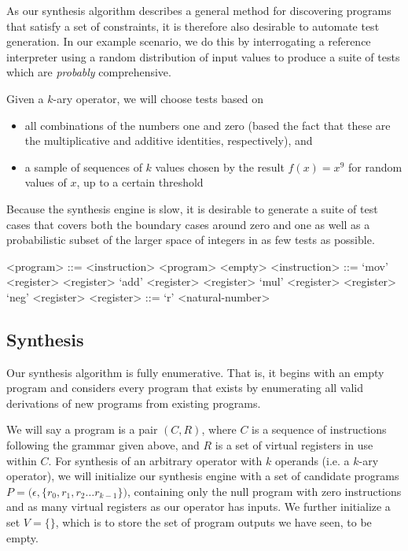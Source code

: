 \documentclass{article}
\begin{document}
As our synthesis algorithm describes a general method for discovering programs
that satisfy a set of constraints, it is therefore also desirable to automate
test generation.  In our example scenario, we do this by interrogating a
reference interpreter using a random distribution of input values to produce
a suite of tests which are \textit{probably} comprehensive.

Given a $k$-ary operator, we will choose tests based on
\begin{itemize}
    \item all combinations of the numbers one and zero (based the fact that
	these are the multiplicative and additive identities, respectively),
	and
    \item a sample of sequences of $k$ values chosen by the result $f(x)=x^{9}$
	for random values of $x$, up to a certain threshold
\end{itemize}

Because the synthesis engine is slow, it is desirable to generate a suite of
test cases that covers both the boundary cases around zero and one as well as
a probabilistic subset of the larger space of integers in as few tests as
possible.

\begin{grammar}
<program> ::= <instruction> <program>
\alt <empty>
<instruction> ::= `mov' <register> <register>
\alt `add' <register> <register>
\alt `mul' <register> <register>
\alt `neg' <register>
<register> ::= `r' <natural-number>
\end{grammar}

\subsection{Synthesis}

Our synthesis algorithm is fully enumerative.  That is, it begins with an empty
program and considers every program that exists by enumerating all valid
derivations of new programs from existing programs.

We will say a program is a pair $(C,R)$, where $C$ is a sequence of
instructions following the grammar given above, and $R$ is a set of virtual
registers in use within $C$.  For synthesis of an arbitrary operator with $k$
operands (i.e. a $k$-ary operator), we will initialize our synthesis engine
with a set of candidate programs $P = {(\epsilon, \{r_{0}, r_{1}, r_{2} \ldots
r_{k-1}}\})$, containing only the null program with zero instructions and as
many virtual registers as our operator has inputs. We further initialize a set
$V = \{\}$, which is to store the set of program outputs we have seen, to be
empty.
\end{document}
